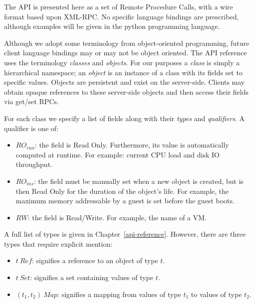 %
%
%
%

The API is presented here as a set of Remote Procedure Calls, with a wire
format based upon XML-RPC. No specific language bindings are prescribed,
although examples will be given in the python programming language.
 
Although we adopt some terminology from object-oriented programming, 
future client language bindings may or may not be object oriented.
The API reference uses the terminology {\em classes\/} and {\em objects\/}.
For our purposes a {\em class\/} is simply a hierarchical namespace;
an {\em object\/} is an instance of a class with its fields set to
specific values. Objects are persistent and exist on the server-side.
Clients may obtain opaque references to these server-side objects and then
access their fields via get/set RPCs.


For each class we specify a list of
fields along with their {\em types\/} and {\em qualifiers\/}.  A
qualifier is one of:
\begin{itemize}
  \item $\mathit{RO}_\mathit{run}$: the field is Read
Only. Furthermore, its value is automatically computed at runtime.
For example: current CPU load and disk IO throughput.
  \item $\mathit{RO}_\mathit{ins}$: the field must be manually set
when a new object is created, but is then Read Only for
the duration of the object's life.
For example, the maximum memory addressable by a guest is set 
before the guest boots.
  \item $\mathit{RW}$: the field is Read/Write. For example, the name
of a VM.
\end{itemize}

A full list of types is given in Chapter~\ref{api-reference}. However,
there are three types that require explicit mention:
\begin{itemize}
  \item $t~\mathit{Ref}$: signifies a reference to an object
of type $t$.
  \item $t~\mathit{Set}$: signifies a set containing
values of type $t$.
  \item $(t_1, t_2)~\mathit{Map}$: signifies a mapping from values of
type $t_1$ to values of type $t_2$.
\end{itemize}

